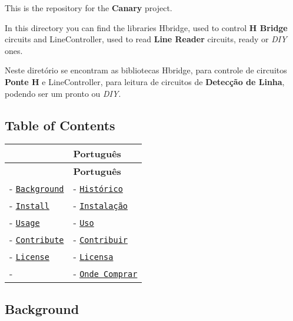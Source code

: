 \href{https://github.com/RichardLitt/standard-readme}{\tt } \href{https://travis-ci.org/dpoltronieri/Canary}{\tt } \href{https://codeclimate.com/github/dpoltronieri/Canary}{\tt } \href{https://codeclimate.com/github/dpoltronieri/Canary/coverage}{\tt } \href{https://codeclimate.com/github/dpoltronieri/Canary}{\tt }

This is the repository for the {\bfseries Canary} project.

In this directory you can find the libraries {\ttfamily Hbridge}, used to control {\bfseries H Bridge} circuits and {\ttfamily Line\+Controller}, used to read {\bfseries Line Reader} circuits, ready or {\itshape D\+IY} ones.

Neste diretório se encontram as bibliotecas {\ttfamily Hbridge}, para controle de circuitos {\bfseries Ponte H} e {\ttfamily Line\+Controller}, para leitura de circuitos de {\bfseries Detecção de Linha}, podendo ser um pronto ou {\itshape D\+IY}.

\subsection*{Table of Contents}

\tabulinesep=1mm
\begin{longtabu} spread 0pt [c]{*2{|X[-1]}|}
\hline
{}&{\bf Português  }\\
\endfirsthead
\hline
\endfoot
\hline
{}&{\bf Português  }\\
\endhead
-\/ \href{#background}{\tt Background} &-\/ \href{#Histórico}{\tt Histórico} \\
-\/ \href{#install}{\tt Install} &-\/ \href{#Instalação}{\tt Instalação} \\
-\/ \href{#usage}{\tt Usage} &-\/ \href{#Uso}{\tt Uso} \\
-\/ \href{#contribute}{\tt Contribute} &-\/ \href{#Contribuir}{\tt Contribuir} \\
-\/ \href{#license}{\tt License} &-\/ \href{#Licensa}{\tt Licensa} \\
-\/ &-\/ \href{http://ohmi.com.br}{\tt Onde Comprar} \\
\end{longtabu}
\subsection*{Background}

